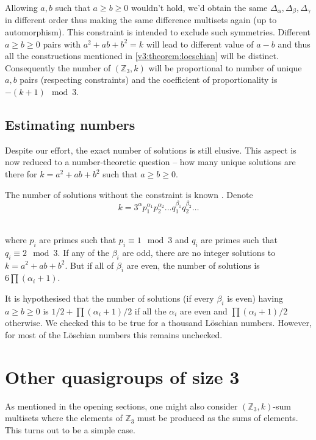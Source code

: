     \begin{remark}
        Allowing $a,b$ such that $a \geq b \geq 0$ wouldn't hold, we'd obtain the same $\Delta_\alpha, \Delta_\beta, \Delta_\gamma$ in different order thus making the same difference multisets again (up to automorphism). This constraint is intended to exclude such symmetries.
        Different $a \geq b \geq 0$ pairs with $a^2+ab+b^2=k$ will lead to different value of $a-b$ and thus all the constructions mentioned in \ref{v3:theorem:loeschian} will be distinct. Consequently the number of $(\mathbb Z_3,k)$ will be proportional to number of unique $a,b$ pairs (respecting constraints) and the coefficient of proportionality is $-(k+1) \mod 3$.
    \end{remark}

    \subsection{Estimating numbers}
        Despite our effort, the exact number of solutions is still elusive. This aspect is now reduced to a number-theoretic question -- how many unique solutions are there for $k=a^2+ab+b^2$ such that $a\geq b\geq 0$.

        The number of solutions without the constraint is known \cite{marmon2005hexagonal}. Denote
        \begin{equation}
            k=3^\alpha p_1^{\alpha_1}p_2^{\alpha_2}\ldots q_1^{\beta_1}q_2^{\beta_2}\ldots
        \end{equation}\
        
        where $p_i$ are primes such that $p_i \equiv 1 \mod 3$ and $q_i$ are primes such that $q_i \equiv 2 \mod 3$. If any of the $\beta_i$ are odd, there are no integer solutions to $k=a^2+ab+b^2$. But if all of $\beta_i$ are even, the number of solutions is $6\prod (\alpha_i +1)$.
        
        It is hypothesised \cite{nair2004elementary} that the number of solutions (if every $\beta_i$ is even) having $a \geq b \geq 0$ is $1/2 + \prod (\alpha_i +1)/2$ if all the $\alpha_i$ are even and $\prod (\alpha_i +1)/2$ otherwise. We checked this to be true for a thousand Löschian numbers. However, for most of the Löschian numbers this remains unchecked.

\section{Other quasigroups of size 3}
    \label{sec:v3}
    As mentioned in the opening sections, one might also consider $(\mathbb Z_3,k)$-sum multisets where the elements of $\mathbb Z_3$ must be produced as the sums of elements. This turns out to be a simple case.


